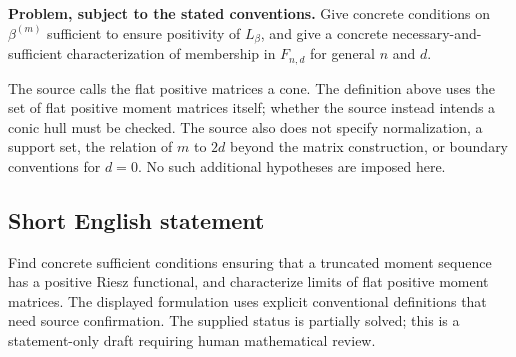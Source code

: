 \documentclass[11pt]{article}
\begin{document}
\textbf{Problem, subject to the stated conventions.} Give concrete conditions on \(\beta^{(m)}\) sufficient to ensure positivity of \(L_\beta\), and give a concrete necessary-and-sufficient characterization of membership in \(F_{n,d}\) for general \(n\) and \(d\).

The source calls the flat positive matrices a cone. The definition above uses the set of flat positive moment matrices itself; whether the source instead intends a conic hull must be checked. The source also does not specify normalization, a support set, the relation of \(m\) to \(2d\) beyond the matrix construction, or boundary conventions for \(d=0\). No such additional hypotheses are imposed here.
\subsection{Short English statement}
Find concrete sufficient conditions ensuring that a truncated moment sequence has a positive Riesz functional, and characterize limits of flat positive moment matrices. The displayed formulation uses explicit conventional definitions that need source confirmation. The supplied status is partially solved; this is a statement-only draft requiring human mathematical review.
\end{document}
